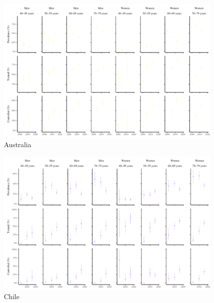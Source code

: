 \documentclass[12pt]{article}
\begin{document}
\begin{appendix}
    \begin{landscape}
        \begin{figure}[H]
            \centering
            \includegraphics[width=\linewidth]{../3_figures/countries/fig_australia.pdf}
            \caption{Australia}
            \label{fig:australia}
        \end{figure}
    
        \begin{figure}[H]
            \centering
            \includegraphics[width=\linewidth]{../3_figures/countries/fig_chile.pdf}
            \caption{Chile}
            \label{fig:chile}
        \end{figure}
    

\end{landscape}
\end{appendix}
\end{document}

